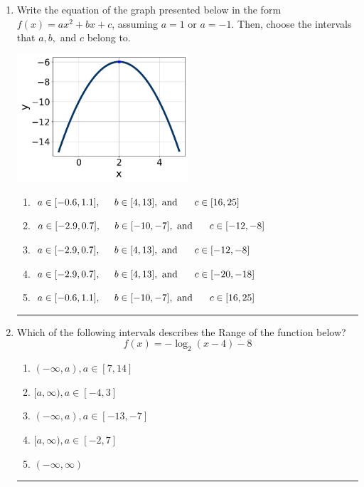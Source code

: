 \documentclass[14pt]{extbook}
\newcommand{\litem}[1]{\item#1\hspace*{-1cm}\rule{\textwidth}{0.4pt}}
\begin{document}
\begin{enumerate}
{\begin{enumerate}[label=\Alph*.]
\end{enumerate} }
\litem{
Write the equation of the graph presented below in the form $f(x)=ax^2+bx+c$, assuming  $a=1$ or $a=-1$. Then, choose the intervals that $a, b,$ and $c$ belong to.
\begin{center}
    \includegraphics[width=0.5\textwidth]{../Figures/quadraticGraphToEquationA.png}
\end{center}
\begin{enumerate}[label=\Alph*.]
\item \( a \in [-0.6, 1.1], \hspace*{5mm} b \in [4, 13], \text{ and } \hspace*{5mm} c \in [16, 25] \)
\item \( a \in [-2.9, 0.7], \hspace*{5mm} b \in [-10, -7], \text{ and } \hspace*{5mm} c \in [-12, -8] \)
\item \( a \in [-2.9, 0.7], \hspace*{5mm} b \in [4, 13], \text{ and } \hspace*{5mm} c \in [-12, -8] \)
\item \( a \in [-2.9, 0.7], \hspace*{5mm} b \in [4, 13], \text{ and } \hspace*{5mm} c \in [-20, -18] \)
\item \( a \in [-0.6, 1.1], \hspace*{5mm} b \in [-10, -7], \text{ and } \hspace*{5mm} c \in [16, 25] \)

\end{enumerate} }
\litem{
Which of the following intervals describes the Range of the function below?\[ f(x) = -\log_2{(x-4)}-8 \]\begin{enumerate}[label=\Alph*.]
\item \( (-\infty, a), a \in [7, 14] \)
\item \( [a, \infty), a \in [-4, 3] \)
\item \( (-\infty, a), a \in [-13, -7] \)
\item \( [a, \infty), a \in [-2, 7] \)
\item \( (-\infty, \infty) \)


\end{enumerate}}
\end{enumerate}
\end{document}
